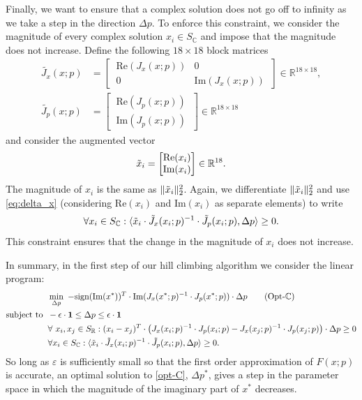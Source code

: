 \documentclass[12pt]{amsart}
\theoremstyle{definition}
\theoremstyle{definition}
\numberwithin{equation}{section}
\newcommand{\RR}{\mathbb{R}}
\newcommand{\CC}{\mathbb{C}}
\begin{document}
Finally, we want to ensure that a complex solution does not go off to infinity as we take a step in the direction $\Delta p$. To enforce this constraint, we consider the magnitude of every complex solution $x_i \in S_{\CC}$ and impose that the magnitude does not increase. Define the following $18\times 18$ block matrices
\begin{align*}
\widetilde{J_{x}}(x;p) &= 
\begin{bmatrix}
\ \text{Re}(J_{x}(x;p)) & 0\  \\ \ 0 & \text{Im}(J_{x}(x;p))\ \end{bmatrix}\in\mathbb{R}^{18\times18},\\[0.5em]
\widetilde{J_{p}}(x;p) &= 
\begin{bmatrix}
\ \text{Re}(J_{p}(x;p))\   \\ \  \text{Im}(J_{p}(x;p))\ 
\end{bmatrix}\in\mathbb{R}^{18\times18}
\end{align*} 
and consider the augmented vector
\[ \Tilde{x}_i = \begin{bmatrix}
\text{Re}(x_i) \\ \text{Im}(x_i)
\end{bmatrix}\in\mathbb R^{18}. \]
The magnitude of $x_i$ is the same as $\lVert \Tilde{x}_i \rVert_2^2$. Again, we differentiate $\lVert \Tilde{x}_i \rVert_2^2$ and use \eqref{eq:delta_x} (considering $\text{Re}(x_i)$ and $\text{Im}(x_i)$ as separate elements) to write
\[ \forall x_i \in S_{\CC} : \langle \Tilde{x}_i \cdot \Tilde{J}_x(x_i;p)^{-1} \cdot \Tilde{J}_p(x_i;p), \Delta p \rangle \geq 0. \]
This constraint ensures that the change in the magnitude of $x_i$ does not increase.

In summary, in the first step of our hill climbing algorithm we consider the linear program:
\footnotesize
\begin{align*}
    & \hspace{0.2cm} \min_{\Delta p} \  -\text{sign}(\text{Im}(x^*))^T \cdot \text{Im}(J_x(x^*;p)^{-1}\cdot J_p(x^*;p) ) \cdot \Delta p  \label{opt-C} \tag{Opt-$\CC$} \\
    \text{subject to} &\hspace{0.2cm} - \epsilon \cdot \mathbf{1} \leq \Delta p \leq \epsilon \cdot \mathbf{1} \\
    &\hspace{0.2cm} \forall \ x_i, x_j \in S_{\RR}: (x_i - x_j)^T \cdot \big( J_x(x_i;p)^{-1} \cdot J_p(x_i;p) - J_x(x_j;p)^{-1} \cdot J_p(x_j;p) \big) \cdot \Delta p \geq 0\\
    &\hspace{0.2cm} \forall x_i \in S_{\CC}: \langle \Tilde{x}_i \cdot \Tilde{J}_x(x_i;p)^{-1} \cdot \Tilde{J}_p(x_i;p), \Delta p \rangle \geq 0.
\end{align*}
\normalsize
So long as $\varepsilon$ is sufficiently small so that the first order approximation of $F(x;p)$ is accurate, an optimal solution to \ref{opt-C}, $\Delta p^{*}$, gives a step in the parameter space in which the magnitude of the imaginary part of $x^{*}$ decreases. 
\end{document}

